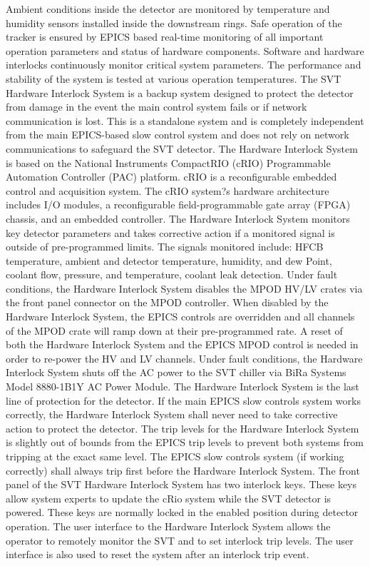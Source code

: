 Ambient conditions inside the detector are monitored by temperature and humidity sensors installed inside the downstream rings. Safe operation of the tracker is ensured by EPICS based real-time monitoring of all important operation parameters and status of hardware components. Software and hardware interlocks continuously monitor critical system parameters. The performance and stability of the system is tested at various operation temperatures. 
The SVT Hardware Interlock System is a backup system designed to protect the detector from damage in the event the main control system fails or if network communication is lost. This is a standalone system and is completely independent from the main EPICS-based slow control system and does not rely on network communications to safeguard the SVT detector. The Hardware Interlock System is based on the National Instruments CompactRIO (cRIO) Programmable Automation Controller (PAC) platform. cRIO is a reconfigurable embedded control and acquisition system. The cRIO system?s hardware architecture includes I/O modules, a reconfigurable field-programmable gate array (FPGA) chassis, and an embedded controller. The Hardware Interlock System monitors key detector parameters and takes corrective action if a monitored signal is outside of pre-programmed limits. The signals monitored include: HFCB temperature, ambient and detector temperature, humidity, and dew Point, coolant flow, pressure, and temperature, coolant leak detection. Under fault conditions, the Hardware Interlock System disables the MPOD HV/LV crates via the front panel connector on the MPOD controller. When disabled by the Hardware Interlock System, the EPICS controls are overridden and all channels of the MPOD crate will ramp down at their pre-programmed rate. A reset of both the Hardware Interlock System and the EPICS MPOD control is needed in order to re-power the HV and LV channels. Under fault conditions, the Hardware Interlock System shuts off the AC power to the SVT chiller via BiRa Systems Model 8880-1B1Y AC Power Module. 
The Hardware Interlock System is the last line of protection for the detector. If the main EPICS slow controls system works correctly, the Hardware Interlock System shall never need to take corrective action to protect the detector. The trip levels for the Hardware Interlock System is slightly out of bounds from the EPICS trip levels to prevent both systems from tripping at the exact same level. The EPICS slow controls system (if working correctly) shall always trip first before the Hardware Interlock System. 
The front panel of the SVT Hardware Interlock System has two interlock keys. These keys allow system experts to update the cRio system while the SVT detector is powered. These keys are normally locked in the enabled position during detector operation.
The user interface to the Hardware Interlock System allows the operator to remotely monitor the SVT and to set interlock trip levels. The user interface is also used to reset the system after an interlock trip event. 

